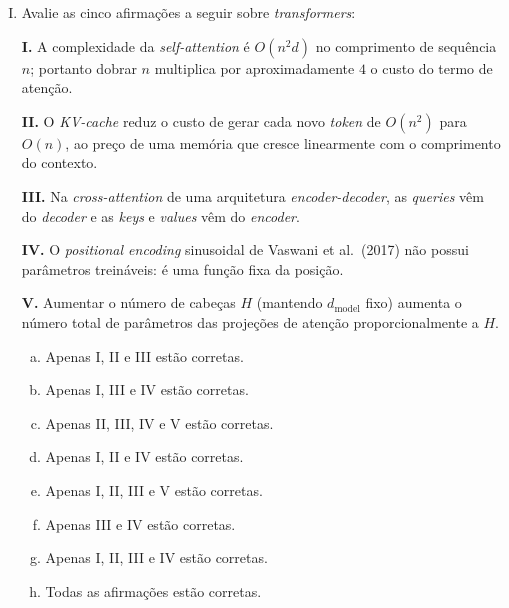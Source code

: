\documentclass{dlproblemset}
\begin{document}
\begin{enumerate}[I)]
\item Avalie as cinco afirmações a seguir sobre \textit{transformers}:

\textbf{I.} A complexidade da \textit{self-attention} é $O(n^2 d)$ no comprimento de sequência $n$; portanto dobrar $n$ multiplica por aproximadamente $4$ o custo do termo de atenção.

\textbf{II.} O \textit{KV-cache} reduz o custo de gerar cada novo \textit{token} de $O(n^2)$ para $O(n)$, ao preço de uma memória que cresce linearmente com o comprimento do contexto.

\textbf{III.} Na \textit{cross-attention} de uma arquitetura \textit{encoder-decoder}, as \textit{queries} vêm do \textit{decoder} e as \textit{keys} e \textit{values} vêm do \textit{encoder}.

\textbf{IV.} O \textit{positional encoding} sinusoidal de Vaswani et al.\ (2017) não possui parâmetros treináveis: é uma função fixa da posição.

\textbf{V.} Aumentar o número de cabeças $H$ (mantendo $d_{\text{model}}$ fixo) aumenta o número total de parâmetros das projeções de atenção proporcionalmente a $H$.

\begin{enumerate}[a)]
    \item Apenas I, II e III estão corretas.
    \item Apenas I, III e IV estão corretas.
    \item Apenas II, III, IV e V estão corretas.
    \item Apenas I, II e IV estão corretas.
    \item Apenas I, II, III e V estão corretas.
    \item Apenas III e IV estão corretas.
    \item Apenas I, II, III e IV estão corretas.
    \item Todas as afirmações estão corretas.
\end{enumerate}


\end{enumerate}
\end{document}
